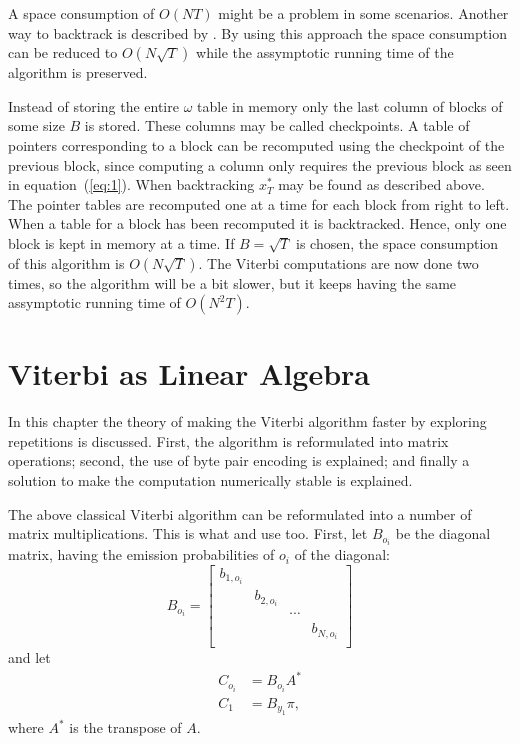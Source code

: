 A space consumption of $O(N T)$ might be a problem in some scenarios. Another
way to backtrack is described by \citet{Tarnas01061998}. By using this approach
the space consumption can be reduced to $O\left(N \sqrt{T} \right)$ while the assymptotic
running time of the algorithm is preserved.

Instead of storing the entire $\omega$ table in memory only the last column of
blocks of some size $B$ is stored. These columns may be called checkpoints. A
table of pointers corresponding to a block can be recomputed using the
checkpoint of the previous block, since computing a column only requires the
previous block as seen in equation~(\ref{eq:1}). When backtracking $x_T^*$ may
be found as described above. The pointer tables are recomputed one at a time
for each block from right to left. When a table for a block has been recomputed
it is backtracked. Hence, only one block is kept in memory at a time. If
$B = \sqrt{T}$ is chosen, the space consumption of this algorithm is
$O\left(N \sqrt{T}\right)$. The Viterbi computations are now done two times, so the
algorithm will be a bit slower, but it keeps having the same assymptotic
running time of $O\left(N^2 T\right)$.

\section{Viterbi as Linear Algebra}
\label{sec:algorithm-as-linear}

In this chapter the theory of making the Viterbi algorithm faster by exploring
repetitions is discussed. First, the algorithm is reformulated into matrix
operations; second, the use of byte pair encoding is explained; and finally
a solution to make the computation numerically stable is explained.

The above classical Viterbi algorithm can be reformulated into a number of
matrix multiplications. This is what \citet{sand2013ziphmmlib} and
\citet{lifshits2009speeding} use too. First, let $B_{o_i}$ be the diagonal
matrix, having the emission probabilities of $o_i$ of the diagonal:
\begin{equation*}
  B_{o_i} =
  \begin{bmatrix}
    b_{1, o_i} &            &        &            \\
               & b_{2, o_i} &        &            \\
               &            & \cdots &            \\
               &            &        & b_{N, o_i} \\
  \end{bmatrix}
\end{equation*}
and let
\begin{align*}
  C_{o_i} &= B_{o_i} A^* \\
  C_1 &= B_{y_1} \pi,
\end{align*}
where $A^*$ is the transpose of $A$.

